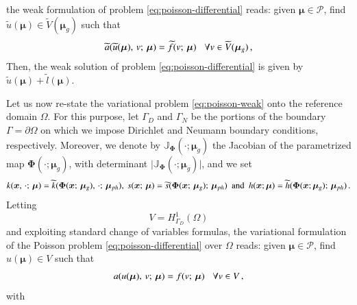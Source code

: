 \documentclass[longtitle]{elsarticle}
\numberwithin{equation}{section}
\theoremstyle{theorem}
\theoremstyle{definition}
\theoremstyle{remark}
\theoremstyle{proposition}
\numberwithin{figure}{section}
\newcommand{\wt}[1]{\widetilde{#1}}
\newcommand{\bg}[1]{\boldsymbol{#1}}
\begin{document}
		the weak formulation of problem \eqref{eq:poisson-differential} reads: given $\bg{\mu} \in \mathcal{P}$, find $\wt{u}(\bg{\mu}) \in \wt{V}(\bg{\mu}_g)$ such that
		\begin{equation}
			\label{eq:poisson-weak}
			\wt{a}(\wt{u}(\bg{\mu}), \, v; \, \bg{\mu}) = \wt{f}(v; \, \bg{\mu}) \hspace*{0.3cm} \forall v \in \wt{V}(\bg{\mu}_g) \, , 
		\end{equation}
		Then, the weak solution of problem \eqref{eq:poisson-differential} is given by $\wt{u}(\bg{\mu}) + \wt{l}(\bg{\mu})$. 

		Let us now re-state the variational problem \eqref{eq:poisson-weak} onto the reference domain $\Omega$. For this purpose, let $\Gamma_D$ and $\Gamma_N$ be the portions of the boundary $\Gamma = \partial \Omega$ on which we impose Dirichlet and Neumann boundary conditions, respectively. Moreover, we denote by $\mathbb{J}_{\bg{\Phi}}(\cdot; \bg{\mu}_g)$ the Jacobian of the parametrized map $\bg{\Phi}(\cdot; \bg{\mu}_g)$, with determinant $\lvert \mathbb{J}_{\bg{\Phi}}(\cdot; \bg{\mu}_g) \rvert$, and we set 
	\vspace*{-0.2cm}	
	\begin{equation*}
		k(\bg{x}, \, \cdot; \, \bg{\mu}) = \wt{k}(\bg{\Phi}(\bg{x}; \, \bg{\mu}_g), \, \cdot; \, \bg{\mu}_{ph}), ~ s(\bg{x}; \, \bg{\mu}) = \wt{s}(\bg{\Phi}(\bg{x}; \, \bg{\mu}_g); \, \bg{\mu}_{ph}) ~~ \text{and} ~~ h(\bg{x}; \bg{\mu}) = \wt{h}(\bg{\Phi}(\bg{x}; \bg{\mu}_g); \, \bg{\mu}_{ph}) \, . 
		\vspace*{-0.2cm}
	\end{equation*}
	Letting \[ V = H^1_{\Gamma_D}(\Omega) \] and exploiting standard change of variables formulas, the variational formulation of the Poisson problem \eqref{eq:poisson-differential} over $\Omega$ reads: given $\bg{\mu} \in \mathcal{P}$, find $u(\bg{\mu}) \in V$ such that
		\begin{equation*}
			\label{eq:poisson-weak-reference}
			a(u(\bg{\mu}), \, v; \, \bg{\mu}) = f(v; \, \bg{\mu}) \hspace*{0.3cm} \forall v \in V \, ,
		\end{equation*}
		with
		\vspace*{0.1cm}
\end{document}
